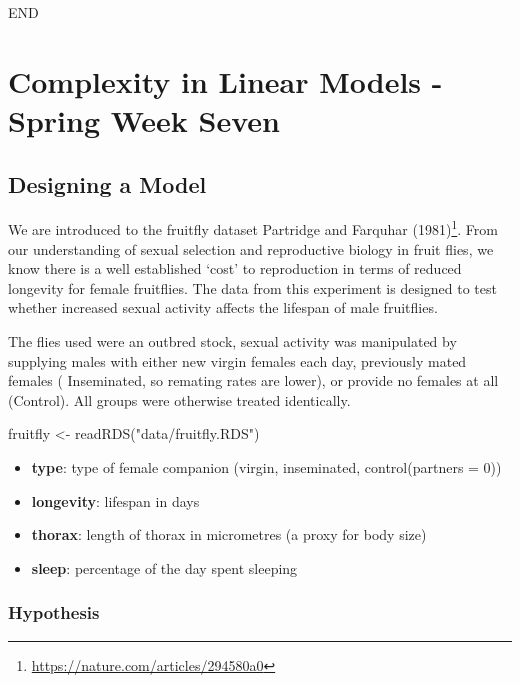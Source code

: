 \documentclass[
]{book}
\newenvironment{Shaded}{\begin{snugshade}}{\end{snugshade}}
\newcommand{\FunctionTok}[1]{\textcolor[rgb]{0.00,0.00,0.00}{#1}}
\newcommand{\NormalTok}[1]{#1}
\newcommand{\OtherTok}[1]{\textcolor[rgb]{0.56,0.35,0.01}{#1}}
\newcommand{\StringTok}[1]{\textcolor[rgb]{0.31,0.60,0.02}{#1}}
\begin{document}
END

\hypertarget{complexity-in-linear-models---spring-week-seven}{%
\chapter{Complexity in Linear Models - Spring Week Seven}\label{complexity-in-linear-models---spring-week-seven}}

\hypertarget{designing-a-model}{%
\section{Designing a Model}\label{designing-a-model}}

We are introduced to the fruitfly dataset Partridge and Farquhar (1981)\footnote{\url{https://nature.com/articles/294580a0}}. From our understanding of sexual selection and reproductive biology in fruit flies, we know there is a well established `cost' to reproduction in terms of reduced longevity for female fruitflies. The data from this experiment is designed to test whether increased sexual activity affects the lifespan of male fruitflies.

The flies used were an outbred stock, sexual activity was manipulated by supplying males with either new virgin females each day, previously mated females ( Inseminated, so remating rates are lower), or provide no females at all (Control). All groups were otherwise treated identically.

\begin{Shaded}
\begin{Highlighting}[]
\NormalTok{fruitfly }\OtherTok{\textless{}{-}} \FunctionTok{readRDS}\NormalTok{(}\StringTok{"data/fruitfly.RDS"}\NormalTok{)}
\end{Highlighting}
\end{Shaded}

\begin{itemize}
\item
  \textbf{type}: type of female companion (virgin, inseminated, control(partners = 0))
\item
  \textbf{longevity}: lifespan in days
\item
  \textbf{thorax}: length of thorax in micrometres (a proxy for body size)
\item
  \textbf{sleep}: percentage of the day spent sleeping
\end{itemize}

\hypertarget{hypothesis-1}{%
\subsection{Hypothesis}\label{hypothesis-1}}
\end{document}
